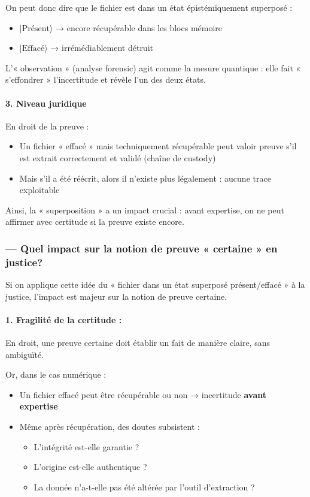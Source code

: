 \documentclass[12pt]{article}
\begin{document}
On peut donc dire que le fichier est dans un état épistémiquement superposé :
\begin{itemize}
\item $|\text{Présent}\rangle$ → encore récupérable dans les blocs mémoire
\item $|\text{Effacé}\rangle$ → irrémédiablement détruit
\end{itemize}

L'« observation » (analyse forensic) agit comme la mesure quantique : elle fait « s'effondrer » l'incertitude et révèle l'un des deux états.

\paragraph{3. Niveau juridique}

En droit de la preuve :
\begin{itemize}
\item Un fichier « effacé » mais techniquement récupérable peut valoir preuve s'il est extrait correctement et validé (chaîne de custody)
\item Mais s'il a été réécrit, alors il n'existe plus légalement : aucune trace exploitable
\end{itemize}

Ainsi, la « superposition » a un impact crucial : avant expertise, on ne peut affirmer avec certitude si la preuve existe encore.

\subsubsection*{— Quel impact sur la notion de preuve « certaine » en justice?}

Si on applique cette idée du « fichier dans un état superposé présent/effacé » à la justice, l'impact est majeur sur la notion de preuve certaine.

\paragraph{1. Fragilité de la certitude :}
En droit, une preuve certaine doit établir un fait de manière claire, sans ambiguïté.

Or, dans le cas numérique :
\begin{itemize}
\item Un fichier effacé peut être récupérable ou non → incertitude \textbf{avant expertise}
\item Même après récupération, des doutes subsistent :
  \begin{itemize}
  \item L'intégrité est-elle garantie ?
  \item L'origine est-elle authentique ?
  \item La donnée n'a-t-elle pas été altérée par l'outil d'extraction ?
  \end{itemize}
\end{itemize}
\end{document}
